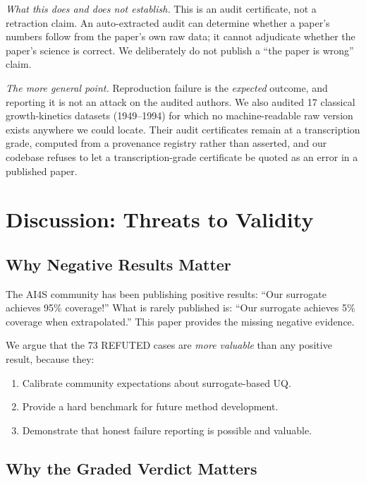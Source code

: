 \documentclass[journal]{IEEEtran}
\begin{document}
\noindent\textit{What this does and does not establish.} This is an audit
certificate, not a retraction claim. An auto-extracted audit can determine
whether a paper's numbers follow from the paper's own raw data; it cannot
adjudicate whether the paper's science is correct. We deliberately do not
publish a ``the paper is wrong'' claim.

\noindent\textit{The more general point.} Reproduction failure is the
\textit{expected} outcome, and reporting it is not an attack on the audited
authors. We also audited 17 classical growth-kinetics datasets (1949--1994)
for which no machine-readable raw version exists anywhere we could locate.
Their audit certificates remain at a transcription grade, computed from a
provenance registry rather than asserted, and our codebase refuses to let a
transcription-grade certificate be quoted as an error in a published paper.

\section{Discussion: Threats to Validity}
\label{sec:discussion}

\subsection{Why Negative Results Matter}

The AI4S community has been publishing positive results: ``Our surrogate
achieves 95\% coverage!'' What is rarely published is: ``Our surrogate
achieves 5\% coverage when extrapolated.'' This paper provides the missing
negative evidence.

We argue that the 73 REFUTED cases are \textit{more valuable} than any
positive result, because they:
\begin{enumerate}
    \item Calibrate community expectations about surrogate-based UQ.
    \item Provide a hard benchmark for future method development.
    \item Demonstrate that honest failure reporting is possible and valuable.
\end{enumerate}

\subsection{Why the Graded Verdict Matters}
\end{document}
